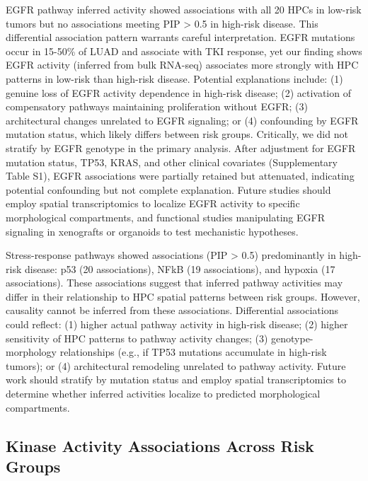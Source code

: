 \documentclass[pdflatex,article,12pt]{article}
\begin{document}
EGFR pathway inferred activity showed associations with all 20 HPCs in low-risk tumors but no associations meeting PIP > 0.5 in high-risk disease. This differential association pattern warrants careful interpretation. EGFR mutations occur in 15-50\% of LUAD and associate with TKI response, yet our finding shows EGFR activity (inferred from bulk RNA-seq) associates more strongly with HPC patterns in low-risk than high-risk disease. Potential explanations include: (1) genuine loss of EGFR activity dependence in high-risk disease; (2) activation of compensatory pathways maintaining proliferation without EGFR; (3) architectural changes unrelated to EGFR signaling; or (4) confounding by EGFR mutation status, which likely differs between risk groups. Critically, we did not stratify by EGFR genotype in the primary analysis. After adjustment for EGFR mutation status, TP53, KRAS, and other clinical covariates (Supplementary Table S1), EGFR associations were partially retained but attenuated, indicating potential confounding but not complete explanation. Future studies should employ spatial transcriptomics to localize EGFR activity to specific morphological compartments, and functional studies manipulating EGFR signaling in xenografts or organoids to test mechanistic hypotheses.

Stress-response pathways showed associations (PIP > 0.5) predominantly in high-risk disease: p53 (20 associations), NFkB (19 associations), and hypoxia (17 associations). These associations suggest that inferred pathway activities may differ in their relationship to HPC spatial patterns between risk groups. However, causality cannot be inferred from these associations. Differential associations could reflect: (1) higher actual pathway activity in high-risk disease; (2) higher sensitivity of HPC patterns to pathway activity changes; (3) genotype-morphology relationships (e.g., if TP53 mutations accumulate in high-risk tumors); or (4) architectural remodeling unrelated to pathway activity. Future work should stratify by mutation status and employ spatial transcriptomics to determine whether inferred activities localize to predicted morphological compartments.

\subsection{Kinase Activity Associations Across Risk Groups}
\end{document}

